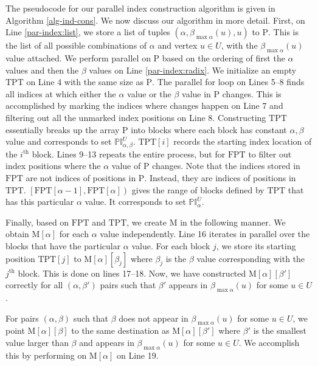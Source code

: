 The pseudocode for our parallel index construction algorithm is given in Algorithm \ref{alg-ind-cons}. We now discuss our algorithm in more detail.
First, on Line \ref{par-index:list}, we store a list of tuples $(\alpha, \beta_{\max \alpha}(u), u)$ to $\text{P}$. This is the list of all possible combinations of $\alpha$ and vertex $u\in U$, with the $\beta_{\max \alpha}(u)$ value attached. We perform parallel  on $\text{P}$ based on the ordering of first the $\alpha$ values and then the $\beta$ values on Line \ref{par-index:radix}. We initialize an empty $\text{TPT}$ on Line 4 with the same size as $\text{P}$. The parallel for loop on Lines 5--8 finds all indices at which either the $\alpha$ value or the $\beta$ value in $\text{P}$ changes. 
This is accomplished by marking the indices where changes happen on Line 7 and filtering out all the unmarked index positions on Line 8. Constructing $\text{TPT}$ essentially breaks up the array $\text{P}$ into blocks where each block has constant $\alpha,\beta$ value and corresponds to set $\mathbb{PI}^U_{\alpha, \beta}$. $\text{TPT}[i]$ records the starting index location of the $i^\text{th}$ block. Lines 9--13 repeats the entire process, but for $\text{FPT}$ to filter out index positions where the $\alpha$ value of $\text{P}$ changes. Note that the indices stored in $\text{FPT}$ are not indices of positions in $\text{P}$. Instead, they are indices of positions in $\text{TPT}$. $\left[\text{FPT}[\alpha-1],\text{FPT}[\alpha]\right)$ gives the range of blocks defined by $\text{TPT}$ that has this particular $\alpha$ value. It corresponds to set $\mathbb{PI}^U_{\alpha}$. 

Finally, based on $\text{FPT}$ and $\text{TPT}$, we create $\text{M}$ in the following manner. We obtain $\text{M}[\alpha]$ for each $\alpha$ value independently. Line 16 iterates in parallel over the blocks that have the particular $\alpha$ value. For each block $j$, we store its starting position $\text{TPT}[j]$ to $\text{M}[\alpha][\beta_j]$ where $\beta_j$ is the $\beta$ value corresponding with the $j^\text{th}$ block. This is done on lines 17--18. Now, we have constructed $\text{M}[\alpha][\beta']$ correctly for all $(\alpha,\beta')$ pairs such that $\beta'$ appears in $\beta_{\max \alpha}(u)$ for some $u\in U$. 

For pairs $(\alpha, \beta)$ such that $\beta$ does not appear in $\beta_{\max \alpha}(u)$ for some $u\in U$, we point $\text{M}[\alpha][\beta]$ to the same destination as $\text{M}[\alpha][\beta']$ where $\beta'$ is the smallest value larger than $\beta$ and appears in $\beta_{\max \alpha}(u)$ for some $u\in U$. We accomplish this by performing  on $\text{M}[\alpha]$ on Line 19.


